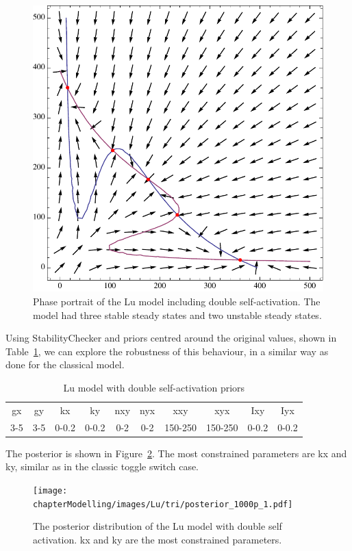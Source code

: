 \begin{figure}[h]
\centering
\includegraphics[scale=0.7]{chapterModelling/images/Lu/mae/selfactivation.pdf}
\caption[Phase portrait of the Lu model including double self-activation]{Phase portrait of the Lu model including double self-activation. The model had three stable steady states and two unstable steady states.}
\label{fig:lu_tri_phse}
\end{figure}
\clearpage
Using StabilityChecker and priors centred around the original values, shown in Table~\ref{tab:lu_dp_pr}, we can explore the robustness of this behaviour, in a similar way as done for the classical model. 
\begin{table}[h]
\centering
\caption{Lu model with double self-activation priors}
\label{tab:lu_dp_pr}
\begin{tabular}{cccccccccc}
gx    & gy    & kx    & ky    & nxy & nyx & xxy     & xyx     & Ixy   & Iyx \\
3-5 & 3-5 & 0-0.2 & 0-0.2 & 0-2 & 0-2 & 150-250 & 150-250 & 0-0.2 &   0-0.2 
\end{tabular}
\end{table}

The posterior is shown in Figure~\ref{fig:lu_tristable}. The most constrained parameters are kx and ky, similar as in the classic toggle switch case.

\begin{figure}[h]
\centering
\texttt{[image: chapterModelling/images/Lu/tri/posterior\_1000p\_1.pdf]}
\caption[The posterior distribution of the Lu model with double self activation]{The posterior distribution of the Lu model with double self activation. kx and ky are the most constrained parameters.}
\label{fig:lu_tristable}
\end{figure}


